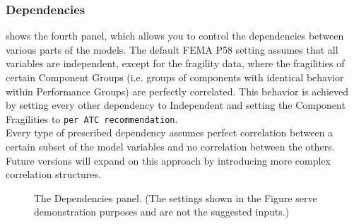 \subsubsection{Dependencies}

 shows the fourth panel, which allows you to control the dependencies between various parts of the models. The default FEMA P58 setting assumes that all variables are independent, except for the fragility data, where the fragilities of certain Component Groups (i.e. groups of components with identical behavior within Performance Groups) are perfectly correlated. This behavior is achieved by setting every other dependency to Independent and setting the Component Fragilities to \texttt{per ATC recommendation}.\\
Every type of prescribed dependency assumes perfect correlation between a certain subset of the model variables and no correlation between the others. Future versions will expand on this approach by introducing more complex correlation structures.

\begin{figure}[!htbp]
	\caption{The Dependencies panel. (The settings shown in the Figure serve demonstration purposes and are not the suggested inputs.)}
	\label{fig:dl_p58_deps}
\end{figure}

